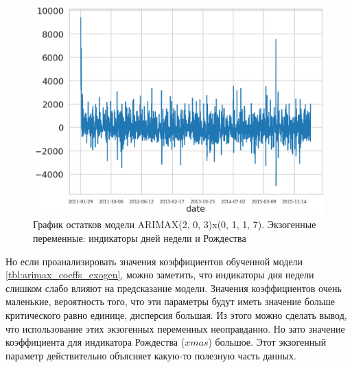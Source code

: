 \def\figurename{Рис}
\begin{figure}[t]
	\centering
	\includegraphics[width=0.5\columnwidth]{./img/arimax_resid_with_xmas.png}
	\caption{График остатков модели ARIMAX(2, 0, 3)x(0, 1, 1, 7). Экзогенные переменные: индикаторы дней недели и Рождества}
	\label{img:arimax_resid_with_xmas}
\end{figure}

Но если проанализировать значения коэффициентов обученной модели \ref{tbl:arimax_coeffs_exogen},
можно заметить, что индикаторы дня недели слишком слабо влияют на предсказание модели.
Значения коэффициентов очень маленькие, вероятность того, что эти параметры будут иметь
значение больше критического равно единице, дисперсия большая. Из этого можно сделать вывод,
что использование этих экзогенных переменных неоправданно. Но зато значение коэффициента
для индикатора Рождества ($ xmas $) большое. Этот экзогенный параметр
действительно объясняет какую-то полезную часть данных.

